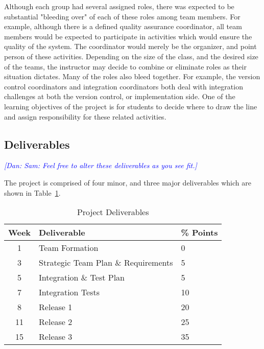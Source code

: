 \documentclass{sig-alternate-05-2015}
\newcommand{\dan}[1]{\textcolor{blue}{{\it [Dan: #1]}}}
\begin{document}
Although each group had several assigned roles, there was expected to be substantial "bleeding over" of each of these roles among team members. For example, although there is a defined quality assurance coordinator, all team members would be expected to participate in activities which would ensure the quality of the system. The coordinator would merely be the organizer, and point person of these activities. Depending on the size of the class, and the desired size of the teams, the instructor may decide to combine or eliminate roles as their situation dictates. Many of the roles also bleed together. For example, the version control coordinators and integration coordinators both deal with integration challenges at both the version control, or implementation side. One of the learning objectives of the project is for students to decide where to draw the line and assign responsibility for these related activities.




\subsection{Deliverables}

\dan{Sam: Feel free to alter these deliverables as you see fit.} %

The project is comprised of four minor, and three major deliverables which are shown in Table~\ref{table:deliverables}.

\begin{table}[h]
\begin{center}
\caption{Project Deliverables}
\label{table:deliverables}
 \begin{tabular}{  c | l | l } %

	 \bfseries Week & \bfseries  Deliverable & \bfseries \% Points \\ \hline
	
	1 & Team Formation & 0 \\ \hline
	3 & Strategic Team Plan \& Requirements & 5 \\ \hline
	5 & Integration \& Test Plan & 5 \\ \hline
	7 & Integration Tests & 10 \\ \hline
	8 & Release 1 & 20 \\ \hline
	11 & Release 2 & 25 \\ \hline
	15 & Release 3 & 35 \\ %
	
        	 	
  \end{tabular}
\end{center}
\end{table}
\end{document}
